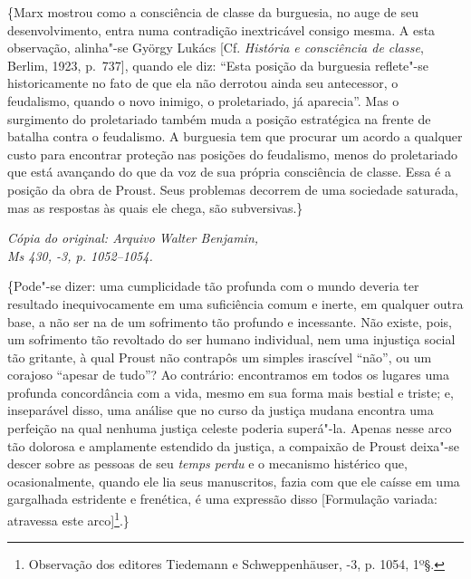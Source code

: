 \{Marx mostrou como a consciência de classe da burguesia, no auge de seu
desenvolvimento, entra numa contradição inextricável consigo mesma. A
esta observação, alinha"-se György Lukács {[}Cf. \emph{História e
consciência de classe}, Berlim, 1923, p.~737{]}, quando ele diz: ``Esta
posição da burguesia reflete"-se historicamente no fato de que ela não
derrotou ainda seu antecessor, o feudalismo, quando o novo inimigo, o
proletariado, já aparecia''. Mas o surgimento do proletariado também
muda a posição estratégica na frente de batalha contra o feudalismo. A
burguesia tem que procurar um acordo a qualquer custo para encontrar
proteção nas posições do feudalismo, menos do proletariado que está
avançando do que da voz de sua própria consciência de classe. Essa é a
posição da obra de Proust. Seus problemas decorrem de uma sociedade
saturada, mas as respostas às quais ele chega, são subversivas.\}


\begin{flushright}
\emph{\footnotesize{Cópia do original: Arquivo Walter Benjamin,\\ Ms 430, -3, p. 1052--1054.}}
\end{flushright}

\{Pode"-se dizer: uma cumplicidade tão profunda com o mundo deveria ter
resultado inequivocamente em uma suficiência comum e inerte, em qualquer
outra base, a não ser na de um sofrimento tão profundo e
incessante. Não existe, pois, um sofrimento tão revoltado do ser
humano individual, nem uma injustiça social tão gritante, à qual Proust
não contrapôs um simples irascível ``não'', ou um corajoso ``apesar de %
tudo''? Ao contrário: encontramos em todos os lugares uma profunda
concordância com a vida, mesmo em sua forma mais bestial e triste; e,
inseparável disso, uma análise que no curso da justiça
mudana encontra uma perfeição na qual nenhuma justiça celeste poderia
superá"-la. Apenas nesse arco tão dolorosa e amplamente estendido da
justiça, a compaixão de Proust deixa"-se descer sobre as pessoas de seu
\emph{temps perdu} e o mecanismo histérico que, ocasionalmente, quando
ele lia seus manuscritos, fazia com que ele caísse em uma gargalhada
estridente e frenética, é uma expressão disso {[}Formulação variada:
atravessa este arco{]}\footnote{Observação dos editores Tiedemann e
  Schweppenhäuser, -3, p. 1054, 1º§. \versal{[N.~T.]}}.\}

